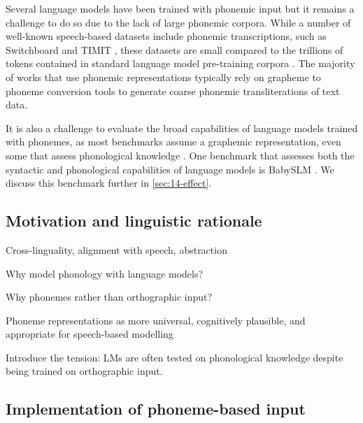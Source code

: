 Several language models have been trained with phonemic input \citep{sundararaman-2021-phonemebert, gale-etal-2023-bort} but it remains a challenge to do so due to the lack of large phonemic corpora. While a number of well-known speech-based datasets include phonemic transcriptions, such as Switchboard \citep{godfrey1992switchboard} and TIMIT \citep{garofolo1993darpa}, these datasets are small compared to the trillions of tokens contained in standard language model pre-training corpora \citep{elazar-2024-redpajama}. The majority of works that use phonemic representations typically rely on grapheme to phoneme conversion tools \citep{bisani-2008-g2p, hasegawa-2020-g2pmultilingual} to generate coarse phonemic transliterations of text data.

It is also a challenge to evaluate the broad capabilities of language models trained with phonemes, as most benchmarks assume a graphemic representation, even some that assess phonological knowledge \citep{suvarna-etal-2024-phonologybench}. One benchmark that assesses both the syntactic and phonological capabilities of language models is BabySLM \citep{lavechin}. %
We discuss this benchmark further in \cref{sec:14-effect}.

\citep{nguyen-2022-word-boundaries,bunzeck2024graphemes}

\subsection{Motivation and linguistic rationale}

Cross-linguality, alignment with speech, abstraction

Why model phonology with language models?

Why phonemes rather than orthographic input?

Phoneme representations as more universal, cognitively plausible, and appropriate for speech-based modelling

Introduce the tension: LMs are often tested on phonological knowledge despite being trained on orthographic input.

\subsection{Implementation of phoneme-based input}


